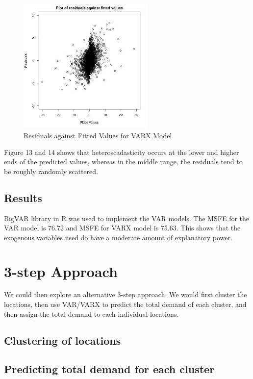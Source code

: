 \documentclass[12pt, letterpaper] {article}
\begin{document}
\begin{figure}[H]
    \centering
    \includegraphics[width=0.6\textwidth, height=0.3\textheight]{Images/Full_VARX_diff_resids_vs_values.jpg}
    \caption{Residuals against Fitted Values for VARX Model}
    \label{fig:Residuals against Fitted Values for VARX Model}
\end{figure}

Figure 13 and 14 shows that heteroscadasticity occurs at the lower and higher ends of the predicted values, whereas in the middle range, the residuals tend to be roughly randomly scattered.

\subsection{Results}
BigVAR library in R was used to implement the VAR models. The MSFE for the VAR model is 76.72 and MSFE for VARX model is 75.63. This shows that the exogenous variables used do have a moderate amount of explanatory power. 

\section{3-step Approach}

We could then explore an alternative 3-step approach. We would first cluster the locations, then use VAR/VARX to predict the total demand of each cluster, and then assign the total demand to each individual locations. 

\subsection{Clustering of locations}

\subsection{Predicting total demand for each cluster}
\end{document}
